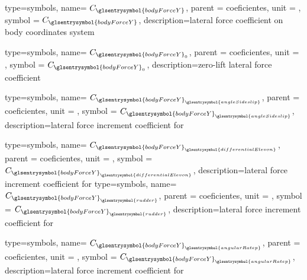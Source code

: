 
{type=symbols,
    name= \ensuremath{C_{\glsentrysymbol{bodyForceY}}},
    parent = {coeficientes},
    unit = \unexpanded{},
    symbol = \ensuremath{C_{\glsentrysymbol{bodyForceY}}},
    description={lateral force coefficient on body coordinates system }
}

{type=symbols,
    name= \ensuremath{C_{\glsentrysymbol{bodyForceY}_{0}}},
    parent = {coeficientes},
    unit = \unexpanded{},
    symbol = \ensuremath{C_{\glsentrysymbol{bodyForceY}_{0}}},
    description={zero-lift lateral force coefficient}
}

{type=symbols,
    name= \ensuremath{C_{{\glsentrysymbol{bodyForceY}}_{\glsentrysymbol{angleSideslip}}}},
    parent = {coeficientes},
    unit = \unexpanded{},
    symbol = \ensuremath{C_{{\glsentrysymbol{bodyForceY}}_{\glsentrysymbol{angleSideslip}}}},
    description={lateral force increment coefficient for }
}

{type=symbols,
    name= \ensuremath{C_{{\glsentrysymbol{bodyForceY}}_{\glsentrysymbol{differentialElevon}}}},
    parent = {coeficientes},
    unit = \unexpanded{},
    symbol = \ensuremath{C_{{\glsentrysymbol{bodyForceY}}_{\glsentrysymbol{differentialElevon}}}},
    description={lateral force increment coefficient for }
}
{type=symbols,
    name= \ensuremath{C_{{\glsentrysymbol{bodyForceY}}_{\glsentrysymbol{rudder}}}},
    parent = {coeficientes},
    unit = \unexpanded{},
    symbol = \ensuremath{C_{{\glsentrysymbol{bodyForceY}}_{\glsentrysymbol{rudder}}}},
    description={lateral force increment coefficient for }
}

{type=symbols,
    name= \ensuremath{C_{{\glsentrysymbol{bodyForceY}}_{\glsentrysymbol{angularRatep}}}},
    parent = {coeficientes},
    unit = \unexpanded{},
    symbol = \ensuremath{C_{{\glsentrysymbol{bodyForceY}}_{\glsentrysymbol{angularRatep}}}},
    description={lateral force increment coefficient for }
}



